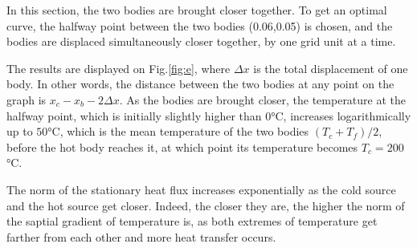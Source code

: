 \documentclass[a4paper,12pt,twoside]{article}
\begin{document}
In this section, the two bodies are brought closer together. To get an optimal curve, the halfway point between the two bodies (0.06,0.05) is chosen, and the bodies are displaced simultaneously closer together, by one grid unit at a time.

The results are displayed on Fig.\ref{fig:e}, where $\Delta x$ is the total displacement of one body. In other words, the distance between the two bodies at any point on the graph is $x_c-x_b-2\Delta x$. As the bodies are brought closer, the temperature at the halfway point, which is initially slightly higher than $0$°C, increases logarithmically up to $50$°C, which is the mean temperature of the two bodies $(T_c+T_f)/2$, before the hot body reaches it, at which point its temperature becomes $T_c=200$°C.

The norm of the stationary heat flux increases exponentially as the cold source and the hot source get closer. Indeed, the closer they are, the higher the norm of the saptial gradient of temperature is, as both extremes of temperature get farther from each other and more heat transfer occurs.
\end{document}
